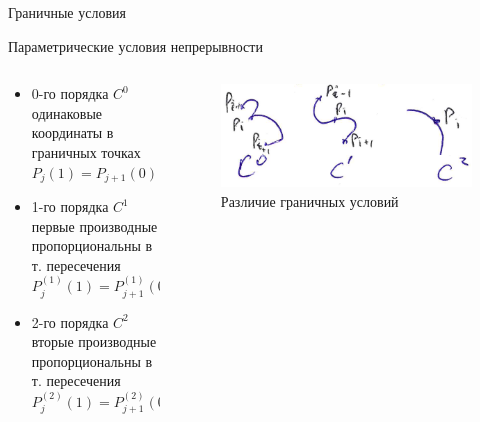 \documentclass{beamer}
\begin{document}
	\begin{frame}{Граничные условия}

		
		Параметрические условия непрерывности


		\begin{columns}
			\begin{column}{0.6\textwidth}
				\begin{itemize}
					\item 0-го порядка $C^0$ \\
					одинаковые координаты в граничных точках \\
					$P_{j}(1) = P_{j+1}(0)$
					\item 1-го порядка $C^1$ \\
					первые производные пропорциональны в т. пересечения \\
					$P_{j}^{(1)}(1) = P_{j+1}^{(1)}(0)$
					\item 2-го порядка $C^2$ \\
					вторые производные пропорциональны в т. пересечения \\
					$P_{j}^{(2)}(1) = P_{j+1}^{(2)}(0)$
				\end{itemize}
			\end{column}
			\begin{column}{0.4\textwidth}
				\begin{figure} 
					\includegraphics[width=\textwidth]{images/continuity_condition.png}
					\caption {Различие граничных условий}
				\end{figure}
			\end{column}
		\end{columns}

		
\end{frame}
\end{document}
